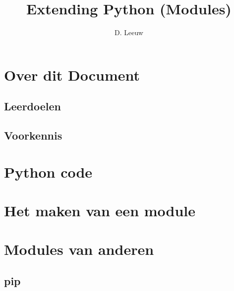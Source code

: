 \documentclass[a4paper,12pt,twoside,openright,titlepage]{article}
\author{D. Leeuw}
\title{Extending Python (Modules)}
\date{\today\\
\vfill
\raggedright
\copyright\ 2025 Dennis Leeuw\\
}
\begin{document}

\maketitle


\section{Over dit Document}
\subsection{Leerdoelen}

\subsection{Voorkennis}




\section{Python code}


\section{Het maken van een module}


\section{Modules van anderen}

\subsection{pip}


\printindex
\end{document}
